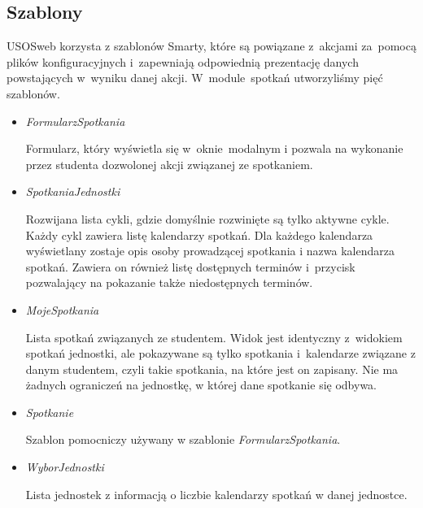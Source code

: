 \documentclass[licencjacka]{pracamgr}
\begin{document}
\subsection{Szablony}
USOSweb korzysta z szablonów Smarty, które są powiązane z~akcjami za~pomocą plików konfiguracyjnych i~zapewniają odpowiednią prezentację danych powstających w~wyniku danej akcji. W~module~spotkań utworzyliśmy pięć szablonów.
\begin{itemize}
\item{\textsl{FormularzSpotkania}}

Formularz, który wyświetla się w~oknie~modalnym i pozwala na wykonanie przez studenta dozwolonej akcji związanej ze spotkaniem.
\item{\textsl{SpotkaniaJednostki}}

Rozwijana lista cykli, gdzie domyślnie rozwinięte są tylko aktywne cykle. Każdy cykl zawiera listę kalendarzy spotkań. Dla każdego kalendarza wyświetlany zostaje opis osoby prowadzącej spotkania i nazwa kalendarza spotkań. Zawiera on również listę dostępnych terminów i~przycisk pozwalający na pokazanie także niedostępnych terminów.
\item{\textsl{MojeSpotkania}}

Lista spotkań związanych ze studentem. Widok jest identyczny z~widokiem spotkań jednostki, ale pokazywane są tylko spotkania i~kalendarze związane z danym studentem, czyli takie spotkania, na które jest on zapisany. Nie ma żadnych ograniczeń na jednostkę, w której dane spotkanie się odbywa.
\item{\textsl{Spotkanie}}

Szablon pomocniczy używany w szablonie \textsl{FormularzSpotkania}.
\item{\textsl{WyborJednostki}}

Lista jednostek z informacją o liczbie kalendarzy spotkań w danej jednostce.
\end{itemize}
\end{document}
